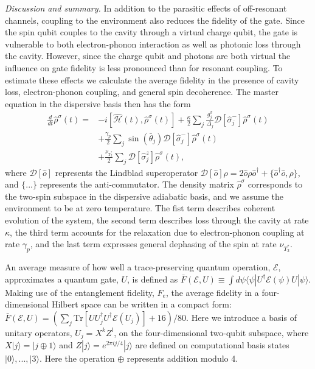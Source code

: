 \documentclass[%
 reprint,
 amsmath,amssymb,
 aps,
prl,
longbibliography
]{revtex4-1}
\begin{document}
\textit{Discussion and summary.} In addition to the parasitic effects of off-resonant channels, coupling to the environment also reduces the fidelity of the gate. Since the spin qubit couples to the cavity through a virtual charge qubit, the gate is vulnerable to both electron-phonon interaction as well as photonic loss through the cavity. However, since the charge qubit and photons are both virtual the influence on gate fidelity is less pronounced than for resonant coupling. To estimate these effects we calculate the average fidelity\cite{Nielsen2002} in the presence of cavity loss, electron-phonon coupling, and general spin decoherence. The master equation in the dispersive basis then has the form
\begin{equation}\label{eqn:MastEqn}
\begin{aligned}
    \frac{d}{dt}\hat{\rho}^\sigma(t) = &-i [\hat{\mathcal{H}}(t),\hat{\rho}^\sigma (t)] +\frac{\kappa}{2}\sum_j\frac{g^\sigma_j}{\Delta_j}\mathcal{D}[\hat{\sigma}^-_j]\hat{\rho}^\sigma (t)\\
    &+\frac{\gamma_p}{2}\sum_j\sin(\bar{\theta}_j)\mathcal{D}[\hat{\sigma}^-_j]\hat{\rho}^\sigma (t)\\ 
    &+ \frac{\nu_{T^*_2}}{2}\sum_j\mathcal{D}[\hat{\sigma}_j^z]\hat{\rho}^\sigma (t),
\end{aligned}    
\end{equation}
where $\mathcal{D}[\hat{o}]$ represents the Lindblad superoperator $\mathcal{D}[\hat{o}]\rho=2\hat{o}\rho \hat{o}^\dagger+\{\hat{o}^\dagger \hat{o},\rho\}$, and $\{...\}$ represents the anti-commutator. The density matrix $\hat{\rho}^\sigma$ corresponds to the two-spin subspace in the dispersive adiabatic basis, and we assume the environment to be at zero temperature. The fist term describes coherent evolution of the system, the second term describes loss through the cavity at rate $\kappa$, the third term accounts for the relaxation due to electron-phonon coupling at rate $\gamma_p$, and the last term expresses general dephasing of the spin at rate $\nu_{T^*_2}$. 

An average measure of how well a trace-preserving quantum operation, $\mathcal{E}$, approximates a quantum gate, $U$, is defined as  $\bar{F}(\mathcal{E},U)\equiv \int d\psi \langle\psi|U^\dagger\mathcal{E}(\psi)U|\psi\rangle$. Making use of the entanglement fidelity\cite{Schumacher1996}, $F_e$, the average fidelity in a four-dimensional Hilbert space can be written in a compact form\cite{Nielsen2002}: $\bar{F}(\mathcal{E},U) = (\sum_j \text{Tr}[UU^\dagger_jU^\dagger\mathcal{E}(U_j)]+16)/80$. Here we introduce a basis of unitary operators, $U_j = X^k Z^l$, on the four-dimensional two-qubit subspace, where $X|j\rangle = |j\oplus 1\rangle$ and $Z|j\rangle = e^{2\pi i j /4}|j\rangle$ are defined on computational basis states $|0\rangle,...,|3\rangle$. Here the operation $\oplus$ represents addition modulo 4.
\end{document}

